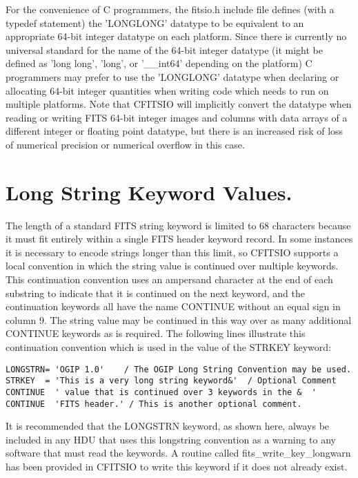 \documentclass[11pt]{book}
\begin{document}
For the convenience of C programmers, the fitsio.h include file
defines (with a typedef statement) the 'LONGLONG' datatype to be
equivalent to an appropriate 64-bit integer datatype on each platform.
Since there is currently no universal standard
for the name of the 64-bit integer datatype (it might be defined as
'long long', 'long', or '\_\_int64' depending on the platform)
C programmers may prefer to use the 'LONGLONG' datatype when
declaring or allocating 64-bit integer quantities when writing
code which needs to run on multiple platforms.
Note that CFITSIO will implicitly convert the datatype when reading
or writing FITS 64-bit integer images and columns with data arrays of
a different integer or floating point datatype, but there is an
increased risk of loss of numerical precision or
numerical overflow  in this case.


\section{Long String Keyword Values.}

The length of a standard FITS string keyword is limited to 68
characters because it must fit entirely within a single FITS header
keyword record.  In some instances it is necessary to encode strings
longer than this limit, so CFITSIO supports a local convention in which
the string value is continued over multiple keywords.  This
continuation convention uses an ampersand character at the end of each
substring to indicate that it is continued on the next keyword, and the
continuation keywords all have the name CONTINUE without an equal sign
in column 9. The string value may be continued in this way over as many
additional CONTINUE keywords as is required.  The following lines
illustrate this continuation convention which is used in the value of
the STRKEY keyword:

\begin{verbatim}
LONGSTRN= 'OGIP 1.0'    / The OGIP Long String Convention may be used.
STRKEY  = 'This is a very long string keyword&'  / Optional Comment
CONTINUE  ' value that is continued over 3 keywords in the &  '
CONTINUE  'FITS header.' / This is another optional comment.
\end{verbatim}
It is recommended that the LONGSTRN keyword, as shown here, always be
included in any HDU that uses this longstring convention as a warning
to any software that must read the keywords.  A routine called fits\_write\_key\_longwarn
has been provided in CFITSIO to write this keyword if it does not
already exist.
\end{document}
